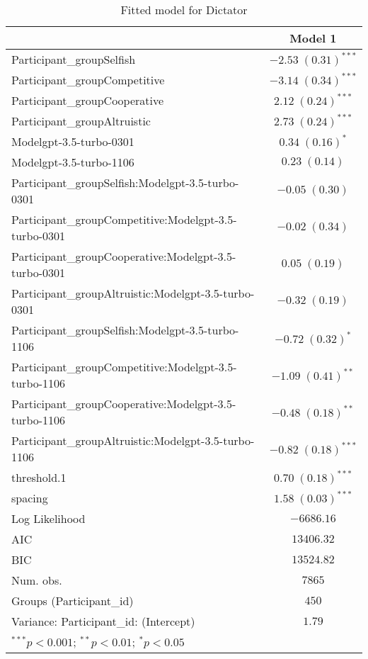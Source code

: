 
\begin{table}
\begin{center}
\begin{small}
\begin{tabular}{l c}
\hline
 & Model 1 \\
\hline
Participant\_groupSelfish                             & $-2.53 \; (0.31)^{***}$ \\
Participant\_groupCompetitive                         & $-3.14 \; (0.34)^{***}$ \\
Participant\_groupCooperative                         & $2.12 \; (0.24)^{***}$  \\
Participant\_groupAltruistic                          & $2.73 \; (0.24)^{***}$  \\
Modelgpt-3.5-turbo-0301                               & $0.34 \; (0.16)^{*}$    \\
Modelgpt-3.5-turbo-1106                               & $0.23 \; (0.14)$        \\
Participant\_groupSelfish:Modelgpt-3.5-turbo-0301     & $-0.05 \; (0.30)$       \\
Participant\_groupCompetitive:Modelgpt-3.5-turbo-0301 & $-0.02 \; (0.34)$       \\
Participant\_groupCooperative:Modelgpt-3.5-turbo-0301 & $0.05 \; (0.19)$        \\
Participant\_groupAltruistic:Modelgpt-3.5-turbo-0301  & $-0.32 \; (0.19)$       \\
Participant\_groupSelfish:Modelgpt-3.5-turbo-1106     & $-0.72 \; (0.32)^{*}$   \\
Participant\_groupCompetitive:Modelgpt-3.5-turbo-1106 & $-1.09 \; (0.41)^{**}$  \\
Participant\_groupCooperative:Modelgpt-3.5-turbo-1106 & $-0.48 \; (0.18)^{**}$  \\
Participant\_groupAltruistic:Modelgpt-3.5-turbo-1106  & $-0.82 \; (0.18)^{***}$ \\
threshold.1                                           & $0.70 \; (0.18)^{***}$  \\
spacing                                               & $1.58 \; (0.03)^{***}$  \\
\hline
Log Likelihood                                        & $-6686.16$              \\
AIC                                                   & $13406.32$              \\
BIC                                                   & $13524.82$              \\
Num. obs.                                             & $7865$                  \\
Groups (Participant\_id)                              & $450$                   \\
Variance: Participant\_id: (Intercept)                & $1.79$                  \\
\hline
\multicolumn{2}{l}{\tiny{$^{***}p<0.001$; $^{**}p<0.01$; $^{*}p<0.05$}}
\end{tabular}
\end{small}
\caption{Fitted model for Dictator}
\label{table:dictator-estimates}
\end{center}
\end{table}
